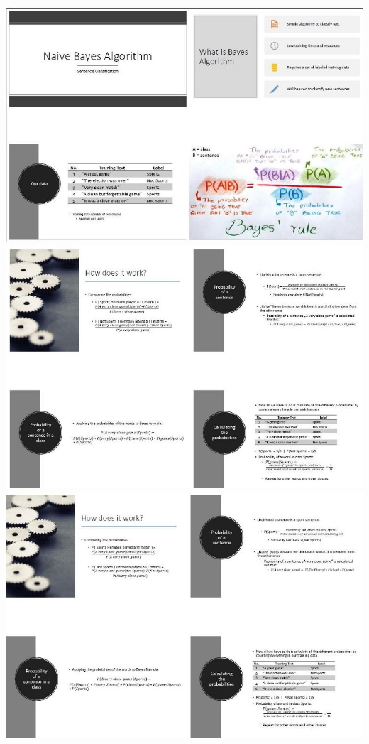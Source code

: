 \documentclass[12pt]{article}
\begin{document}
\begin{center}
\hspace*{-1.cm}   
\includegraphics[width=1.2\textwidth]{Bayes-Text-Classification01}
\includegraphics[width=1.1\textwidth]{Bayes-Text-Classification02}
\includegraphics[width=1.1\textwidth]{Bayes-Text-Classification03}
\end{center}
\end{document}
